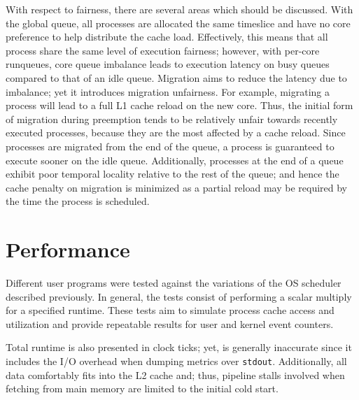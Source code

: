 \documentclass[11pt]{article}
\begin{document}
With respect to fairness, there are several areas which should be discussed.  With the global queue, all processes are allocated the same timeslice and have no core preference to help distribute the cache load.  Effectively, this means that all process share the same level of execution fairness; however, with per-core runqueues, core queue imbalance leads to execution latency on busy queues compared to that of an idle queue.  Migration aims to reduce the latency due to imbalance; yet it introduces migration unfairness.  For example, migrating a process will lead to a full L1 cache reload on the new core.  Thus, the initial form of migration during preemption tends to be relatively unfair towards recently executed processes, because they are the most affected by a cache reload.  Since processes are migrated from the end of the queue, a process is guaranteed to execute sooner on the idle queue.  Additionally, processes at the end of a queue exhibit poor temporal locality relative to the rest of the queue; and hence the cache penalty on migration is minimized as a partial reload may be required by the time the process is scheduled.

\section{Performance}
\label{sec:performance}
Different user programs were tested against the variations of the OS scheduler described previously.  In general, the tests consist of performing a scalar multiply for a specified runtime.  These tests aim to simulate process cache access and utilization and provide repeatable results for user and kernel event counters.

Total runtime is also presented in clock ticks; yet, is generally inaccurate since it includes the I/O overhead when dumping metrics over \texttt{stdout}.  Additionally, all data comfortably fits into the L2 cache and; thus, pipeline stalls involved when fetching from main memory are limited to the initial cold start.
\end{document}

